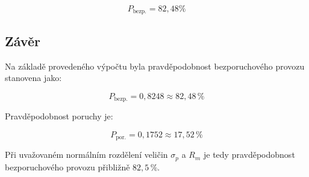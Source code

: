 \[
P_{\text{bezp.}} = 82{,}48 \%
\]

\subsection*{Závěr}

Na základě provedeného výpočtu byla pravděpodobnost bezporuchového provozu stanovena jako:

\[
\boxed{P_{\text{bezp.}} = 0{,}8248 \approx 82{,}48\,\%}
\]

\noindent
Pravděpodobnost poruchy je:

\[
\boxed{P_{\text{por.}} = 0{,}1752 \approx 17{,}52\,\%}
\]

\noindent
Při uvažovaném normálním rozdělení veličin $\sigma_p$ a $R_m$ je tedy pravděpodobnost bezporuchového provozu přibližně $82{,}5\,\%$.

